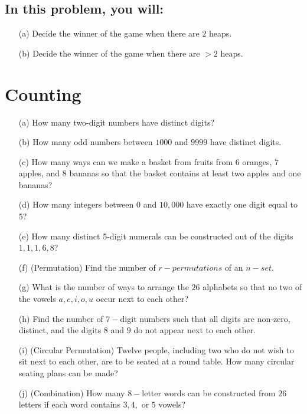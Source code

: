 \documentclass[addpoints]{exam}
\begin{document}
\subsection*{In this problem, you will:}
\begin{enumerate}
	\item[(a)] Decide the winner of the game when there are $2$ heaps.
	\item[(b)] Decide the winner of the game when there are $> 2$ heaps.
\end{enumerate}
\newpage

\section{Counting}
\begin{enumerate}
	\item[(a)] How many two-digit numbers have distinct digits?
	\item[(b)] How many odd numbers between $1000$ and $9999$ have distinct digits.
	\item[(c)] How many ways can we make a basket from fruits from $6$ oranges, $7$ apples, and $8$ bananas so that the basket contains at least two apples and one bananas?
	\item [(d)] How many integers between $0$ and $10,000$ have exactly one digit equal to $5$?
	\item [(e)] How many distinct 5-digit numerals can be constructed out of the digits $1, 1, 1, 6, 8$?
	\item [(f)] (Permutation) Find the number of $r-permutations$ of an $n-set$.
	\item[(g)] What is the number of ways to arrange the $26$ alphabets so that no two of the vowels $a, e, i, o, u$ occur next to each other?
	\item[(h)] Find the number of $7-$digit numbers such that all digits are non-zero, distinct, and the digits $8$ and $9$ do not appear next to each other.
	\item[(i)] (Circular Permutation) Twelve people, including two who do not wish to sit next to each other, are to be seated at a round table. How many circular seating plans can be made?
	\item [(j)] (Combination) How many $8-$letter words can be constructed from $26$ letters if each word contains $3, 4,$ or $5$ vowels?
\end{enumerate}
\end{document}
